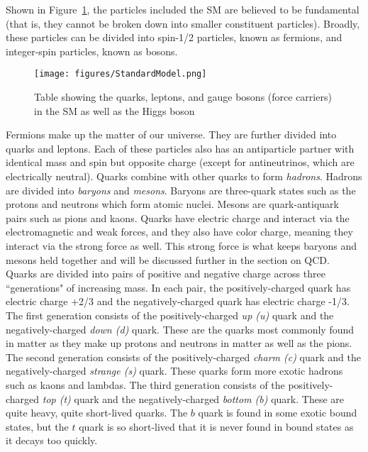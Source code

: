 Shown in Figure~\ref{fig:StandardModel}, the particles included the SM are believed to be fundamental (that is, they cannot be broken down into smaller constituent particles). Broadly, these particles can be divided into spin-1/2 particles, known as fermions, and integer-spin particles, known as bosons. 

\begin{figure}
\centering
  \texttt{[image: figures/StandardModel.png]}
  \caption{\label{fig:StandardModel} Table showing the quarks, leptons, and gauge bosons (force carriers) in the SM as well as the Higgs boson\cite{StandardModelTable}}
\end{figure}


Fermions make up the matter of our universe. They are further divided into quarks and leptons. Each of these particles also has an antiparticle partner with identical mass and spin but opposite charge (except for antineutrinos, which are electrically neutral). Quarks combine with other quarks to form \textit{hadrons}. Hadrons are divided into \textit{baryons} and \textit{mesons}. Baryons are three-quark states such as the protons and neutrons which form atomic nuclei. Mesons are quark-antiquark pairs such as pions and kaons. Quarks have electric charge and interact via the electromagnetic and weak forces, and they also have color charge, meaning they interact via the strong force as well. This strong force is what keeps baryons and mesons held together and will be discussed further in the section on QCD. Quarks are divided into pairs of positive and negative charge across three ``generations" of increasing mass. In each pair, the positively-charged quark has electric charge +2/3 and the negatively-charged quark has electric charge -1/3. The first generation consists of the positively-charged \textit{up (u)} quark and the negatively-charged \textit{down (d)} quark. These are the quarks most commonly found in matter as they make up protons and neutrons in matter as well as the pions. The second generation consists of the positively-charged \textit{charm (c)} quark and the negatively-charged \textit{strange (s)} quark. These quarks form more exotic hadrons such as kaons and lambdas. The third generation consists of the positively-charged \textit{top (t)} quark and the negatively-charged \textit{bottom (b)} quark. These are quite heavy, quite short-lived quarks. The  $b$ quark is found in some exotic bound states, but the $t$ quark is so short-lived that it is never found in bound states as it decays too quickly.

